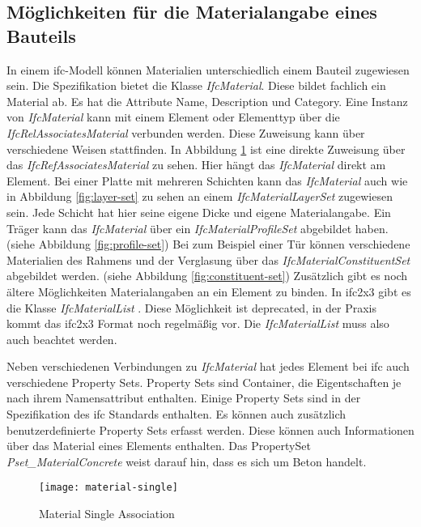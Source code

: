 \subsection{Möglichkeiten für die  Materialangabe eines Bauteils}
\label{c:basics:ifc:buildingmaterial}
In einem \ac{ifc}-Modell können Materialien unterschiedlich einem Bauteil zugewiesen sein. Die Spezifikation bietet die Klasse \textit{IfcMaterial}. Diese bildet fachlich ein Material ab. Es hat die Attribute Name, Description und Category.\citep{ifc_material} Eine Instanz von \textit{IfcMaterial} kann mit einem Element oder Elementtyp über die \textit{IfcRelAssociatesMaterial} verbunden werden. Diese Zuweisung kann über verschiedene Weisen stattfinden. In Abbildung \ref{fig:material-single} ist eine direkte Zuweisung über das \textit{IfcRefAssociatesMaterial} zu sehen. Hier hängt das \textit{IfcMaterial} direkt am Element. 
Bei einer Platte mit mehreren Schichten kann das \textit{IfcMaterial} auch wie in Abbildung \ref{fig:layer-set} zu sehen an einem \textit{IfcMaterialLayerSet} zugewiesen sein. Jede Schicht hat hier seine eigene Dicke und eigene Materialangabe. 
Ein Träger kann das \textit{IfcMaterial} über ein \textit{IfcMaterialProfileSet} abgebildet haben. (siehe Abbildung \ref{fig:profile-set})
Bei zum Beispiel einer Tür können verschiedene Materialien des Rahmens und der Verglasung über das \textit{IfcMaterialConstituentSet} abgebildet werden. (siehe Abbildung \ref{fig:constituent-set}) \citep{ifc_material_association}
Zusätzlich gibt es noch ältere Möglichkeiten Materialangaben an ein Element zu binden. In \ac{ifc2x3} gibt es die Klasse \textit{IfcMaterialList} \citep{Thomas2007_MaterialList}. Diese Möglichkeit ist deprecated, in der Praxis kommt das \ac{ifc2x3} Format noch regelmäßig vor. Die \textit{IfcMaterialList} muss also auch beachtet werden.

Neben verschiedenen Verbindungen zu \textit{IfcMaterial} hat jedes Element bei \ac{ifc} auch verschiedene Property Sets. Property Sets sind Container, die Eigentschaften je nach ihrem Namensattribut enthalten. Einige Property Sets sind in der Spezifikation des \ac{ifc} Standards enthalten. Es können auch zusätzlich benutzerdefinierte Property Sets erfasst werden. Diese können auch Informationen über das Material eines Elements enthalten. \citep{ifc_property_set} Das PropertySet \textit{Pset\_MaterialConcrete} weist darauf hin, dass es sich um Beton handelt.

\begin{figure}[h]
	\centering
	\texttt{[image: material-single]}
	\caption[IfcMaterial]{Material Single Association}
	\label{fig:material-single}
\end{figure}


